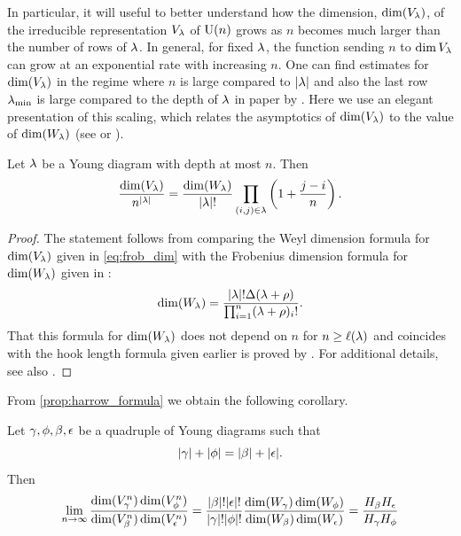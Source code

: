 \documentclass[notitlepage, 11pt, letterpaper]{amsart}
\begin{document}
In particular, it will useful to better understand how the dimension, $\dim(V_{\lambda})$, of the irreducible representation $V_{\lambda}$ of $\operatorname{U}(n)$ grows as $n$ becomes much larger than the number of rows of $\lambda$.
In general, for fixed $\lambda$, the function sending $n$ to $\dim V_{\lambda}$ can grow at an exponential rate with increasing $n$.
One can find estimates for $\dim(V_{\lambda})$ in the regime where $n$ is large compared to ${|\lambda|}$ and also the last row $\lambda_{\min}$ is large compared to the depth of $\lambda$ in paper by  \cite[Section III]{itzykson1966unitary}.
Here we use an elegant presentation of this scaling, which relates the asymptotics of $\dim(V_{\lambda})$ to the value of $\dim(W_{\lambda})$ (see \cite[Lemma 2]{harrow2023approximate} or \cite[Equations (25,26)]{childs2007weak}).
\begin{prop}
    \label{prop:harrow_formula}
    Let $\lambda$ be a Young diagram with depth at most $n$. Then
    \begin{equation}
        \frac{\dim(V_{\lambda})}{n^{{|\lambda|}}} = \frac{\dim(W_{\lambda})}{{|\lambda|}!}\prod_{(i,j) \in \lambda} \left(1 + \frac{j-i}{n}\right).
    \end{equation}
\end{prop}
\begin{proof}
    The statement follows from comparing the Weyl dimension formula for $\dim(V_{\lambda})$ given in \cref{eq:frob_dim} with the Frobenius dimension formula for $\dim(W_{\lambda})$ given in \cite[Corollaries 9.1.5]{goodman2000representations}:
    \begin{equation}
        \label{eq:frob_dim}
        \dim(W_{\lambda}) = \frac{{|\lambda|}!\Delta(\lambda + \rho)}{\prod_{i=1}^{n}(\lambda+\rho)_i!}.
    \end{equation}
    That this formula for $\dim(W_{\lambda})$ does not depend on $n$ for $n \geq \ell(\lambda)$ and coincides with the hook length formula given earlier is proved by \cite[Corollary 9.1.6]{goodman2000representations}.
    For additional details, see also \cite[Appendix A]{harrow2023approximate}.
\end{proof}
From \cref{prop:harrow_formula} we obtain the following corollary.
\begin{cor}
    \label{cor:harrow_ssa_lim}
    Let $\gamma,\phi,\beta,\epsilon$ be a quadruple of Young diagrams such that
    \begin{equation}
        \label{eq:balanced_sizes}
        {|\gamma|}+{|\phi|} = {|\beta|}+{|\epsilon|}.
    \end{equation}
    Then
    \begin{equation}
        \lim_{n\to\infty}
        \frac{\dim(V_{\gamma}^n) \dim(V_{\phi}^n)}{\dim(V_{\beta}^n) \dim(V_{\epsilon}^n)} =
        \frac{{|\beta|}!{|\epsilon|}!}{{|\gamma|}!{|\phi|}!}
        \frac{\dim(W_{\gamma}) \dim(W_{\phi})}{\dim(W_{\beta}) \dim(W_{\epsilon})}
        = \frac{H_{\beta}H_{\epsilon}}{H_{\gamma}H_{\phi}}
    \end{equation}
\end{cor}
\end{document}
